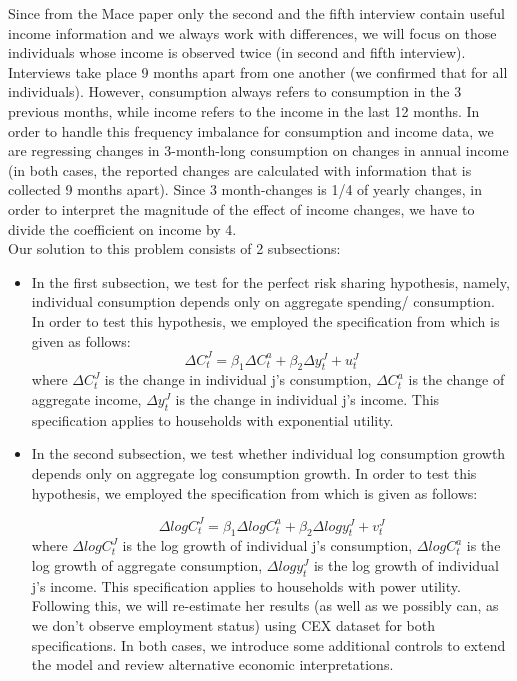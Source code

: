 \documentclass[12pt,a4paper]{article}
\begin{document}
Since from the Mace paper only the second and the fifth interview contain useful income information and we always work with differences, we will focus on those individuals whose income is observed twice (in second and fifth interview). \\

Interviews take place 9 months apart from one another (we confirmed that for all individuals). However, consumption always refers to consumption in the 3 previous months, while income refers to the income in the last 12 months. In order to handle this frequency imbalance for consumption and income data, we are regressing changes in 3-month-long consumption on changes in annual income (in both cases, the reported changes are calculated with information that is collected 9 months apart). Since 3 month-changes is 1/4 of yearly changes, in order to interpret the magnitude of the effect of income changes, we have to divide the coefficient on income by 4.\\


Our solution to this problem consists of 2 subsections:
\begin{itemize}
    \item In the first subsection, we test for the perfect risk sharing hypothesis, namely, individual consumption depends only on aggregate spending/ consumption. In order to test this hypothesis, we employed the specification from \citealp{mace1991} which is given as follows:
\begin{equation}\label{one}
      \Delta C_t^J =\beta_1 \Delta C_t^a + \beta_2 \Delta y_t^J + u_t^J
\end{equation}
where $\Delta C_t^J$ is the change in individual j's consumption, $\Delta C_t^a$ is the change of aggregate income, $\Delta y_t^J$ is the change in individual j's income. This specification applies to households with exponential utility.

\item In the second subsection, we test whether individual log consumption growth depends only on aggregate log consumption growth. In order to test this hypothesis, we employed the specification from \citealp{mace1991} which is given as follows:

\begin{equation}\label{two}
      \Delta log  C_t^J =\beta_1 \Delta log C_t^a + \beta_2 \Delta log y_t^J + v_t^J
\end{equation}
where   $\Delta log  C_t^J$ is the log growth of individual j's consumption,   $  \Delta log  C_t^a$ is the log growth of aggregate consumption,  $ \Delta log y_t^J$ is the log growth of  individual j's income. This specification applies to households with power utility. \\

Following this, we will re-estimate her results (as well as we possibly can, as we don’t observe employment status) using CEX dataset for both specifications. In both cases, we introduce some additional controls to extend the model and review alternative economic interpretations.
\end{itemize}
\end{document}
